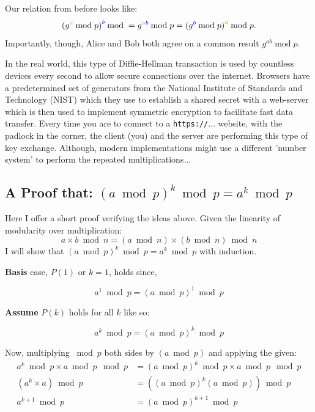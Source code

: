 \documentclass[11pt, a4paper]{report}
\begin{document}
Our relation from before looks like:
\[ (g^{\color{orange}{a}}\color{black}{\:\mathrm{mod}\; p)}^{\color{blue}{b}}\color{black}{\:\mathrm{mod}\; =\; }g^{\color{orange}{a}\color{blue}{b}} \:\mathrm{mod}\; p = (g^{\color{blue}{b}}\color{black}{\:\mathrm{mod}\; p)}^{\color{orange}{a}} \color{black}{\:\mathrm{mod}\; p.}  \]
Importantly, though, Alice and Bob both agree on a common result $g^{ab}\;\mathrm{mod}\;p$.

In the real world, this type of Diffie-Hellman transaction is used by countless devices every second to allow secure connections over the internet. Browsers have a predetermined set of generators from the National Institute of Standards and Technology (NIST) which they use to establish a shared secret with a web-server which is then used to implement symmetric encryption to facilitate fast data transfer. Every time you are to connect to a \texttt{https://}... website, with the padlock in the corner, the client (you) and the server are performing this type of key exchange. Although, modern implementations might use a different 'number system' to perform the repeated multiplications...

\subsection{A Proof that: $(a \bmod p)^k \bmod p = a^k \bmod p$}

Here I offer a short proof verifying the ideas above.
Given the linearity of modularity over multiplication:
$$a \times b \bmod n = (a \bmod n) \times (b \bmod n) \bmod n$$
I will show that $(a \bmod p)^k \bmod p = a^k \bmod p$ with induction.
\vspace*{0.4cm}

\textbf{Basis} case, $P(1)$ or $k=1$, holds since,

\[ a^1 \bmod p = (a \bmod p)^1 \bmod p \tag{basis}  \]

\textbf{Assume} $P(k)$ holds for all $k$ like so:

\[ a^k \bmod p = (a \bmod p)^k \bmod p \tag{P(k)} \]

Now, multiplying $ \bmod p$ both sides by $(a \bmod p)$ and applying the given:
\begin{align*}
a^k \bmod p \times a \bmod p \mod p &= (a \bmod p)^k \bmod p \times a \bmod p \mod p\\
(a^k \times a) \bmod p  &= ((a \bmod p)^k (a \bmod p)) \bmod p\\
a^{k+1} \bmod p  &= (a \bmod p)^{k+1} \bmod p \tag{P(k+1)}
\end{align*}
\end{document}
